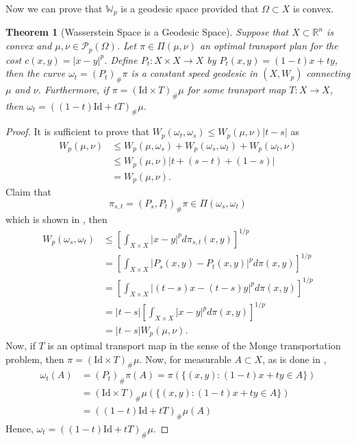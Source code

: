 \documentclass[12pt]{article}
\newcommand{\R}{\mathbb{R}}
\theoremstyle{plain}
\newtheorem{thm}{Theorem}[section]
\numberwithin{equation}{section}
\begin{document}
Now we can prove that $\mathbb{W}_p$ is a geodesic space provided that $\Omega \subset X$ is convex.
\begin{thm}[Wasserstein Space is a Geodesic Space]\label{thm:geodesic}
  Suppose that $X\subset \R^n$ is convex and $\mu,\nu \in \mathcal{P}_p(\Omega)$. Let $\pi\in \Pi(\mu,\nu)$ an 
  optimal transport plan for the cost $c(x,y) = |x-y|^p$. Define $P_t : X\times X \to X$ by $P_t(x,y) = (1-t)x + ty$, then the 
  curve $\omega_t = (P_t)_\#\pi$ is a constant speed geodesic in $(X, W_p)$ connecting $\mu$ and $\nu$. Furthermore, if $\pi = (\text{Id}\times T)_\#\mu$ for some transport map $T:X\to X$, then 
  $\omega_t = ((1-t)\text{Id} + tT)_\# \mu$. 
\end{thm}
\begin{proof}
  It is sufficient to prove that $W_p(\omega_t,\omega_s) \le W_p(\mu,\nu)|t-s|$ as 
  \begin{align*}
    W_p(\mu,\nu) &\le W_p(\mu,\omega_s) + W_p(\omega_s,\omega_t) + W_p(\omega_t,\nu) \\
    &\le W_p(\mu,\nu)|t+(s-t)+(1-s)|\\
    & = W_p(\mu,\nu).
  \end{align*}
  Claim that \begin{equation}\label{eqn:lemgeo}\pi_{s,t} = (P_s,P_t)_\#\pi\in \Pi(\omega_s,\omega_t)\end{equation}
  which is shown in \cite{thorpe}, then 
  \begin{align*}
    W_p(\omega_s,\omega_t) &\le \left[\int_{X\times X}|x-y|^pd\pi_{s,t}(x,y)\right]^{1/p}\\
    & = \left[\int_{X\times X}|P_s(x,y)-P_t(x,y)|^pd\pi(x,y)\right]^{1/p} \\
    &= \left[\int_{X\times X}|(t-s)x-(t-s)y|^pd\pi(x,y)\right]^{1/p} \\
    &= |t-s|\left[\int_{X\times X}|x-y|^pd\pi(x,y)\right]^{1/p} \\
    &= |t-s|W_p(\mu,\nu).
  \end{align*}
  Now, if $T$ is an optimal transport map in the sense of the Monge transportation problem, then $\pi = (\text{Id}\times T)_\#\mu$. Now, for measurable $A\subset X$, as is done in \cite{thorpe},
  \begin{align*}
    \omega_t(A) &= (P_t)_\#\pi(A) = \pi(\{(x,y) : (1-t)x + ty\in A\}) \\
    &= (\text{Id}\times T)_\#\mu(\{(x,y):(1-t)x + ty\in A\}) \\
    &= ((1-t)\text{Id} + tT)_\#\mu(A)
  \end{align*}
  Hence, $\omega_t = ((1-t)\text{Id} + tT)_\#\mu.$
\end{proof}
\newpage
\end{document}
